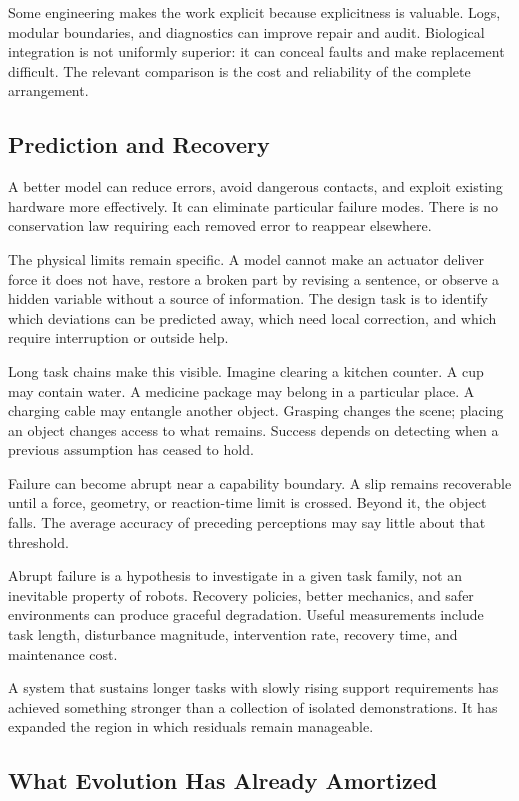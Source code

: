 \documentclass[11pt,openany]{book}
\begin{document}
Some engineering makes the work explicit because explicitness is valuable. Logs, modular boundaries, and diagnostics can improve repair and audit. Biological integration is not uniformly superior: it can conceal faults and make replacement difficult. The relevant comparison is the cost and reliability of the complete arrangement.

\subsection{Prediction and Recovery}

A better model can reduce errors, avoid dangerous contacts, and exploit existing hardware more effectively. It can eliminate particular failure modes. There is no conservation law requiring each removed error to reappear elsewhere.

The physical limits remain specific. A model cannot make an actuator deliver force it does not have, restore a broken part by revising a sentence, or observe a hidden variable without a source of information. The design task is to identify which deviations can be predicted away, which need local correction, and which require interruption or outside help.

Long task chains make this visible. Imagine clearing a kitchen counter. A cup may contain water. A medicine package may belong in a particular place. A charging cable may entangle another object. Grasping changes the scene; placing an object changes access to what remains. Success depends on detecting when a previous assumption has ceased to hold.

Failure can become abrupt near a capability boundary. A slip remains recoverable until a force, geometry, or reaction-time limit is crossed. Beyond it, the object falls. The average accuracy of preceding perceptions may say little about that threshold.

Abrupt failure is a hypothesis to investigate in a given task family, not an inevitable property of robots. Recovery policies, better mechanics, and safer environments can produce graceful degradation. Useful measurements include task length, disturbance magnitude, intervention rate, recovery time, and maintenance cost.

A system that sustains longer tasks with slowly rising support requirements has achieved something stronger than a collection of isolated demonstrations. It has expanded the region in which residuals remain manageable.

\subsection{What Evolution Has Already Amortized}
\end{document}
